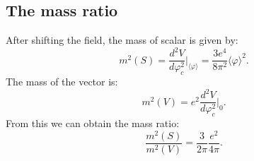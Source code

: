 \subsection{The mass ratio}
After shifting the field, the mass of scalar is given by:
\begin{equation}
m^2(S) = \frac{d^2V}{d\varphi_c^2}\Big|_{\langle\varphi\rangle} = \frac{3e^4}{8\pi^2}\langle\varphi\rangle^2.
\end{equation}
The mass of the vector is:
\begin{equation}
m^2(V) = e^2\frac{d^2V}{d\varphi_c^2}\Big|_0.
\end{equation}
From this we can obtain the mass ratio:
\begin{equation}
\frac{m^2(S)}{m^2(V)} = \frac{3}{2\pi}\frac{e^2}{4\pi}.
\end{equation}












